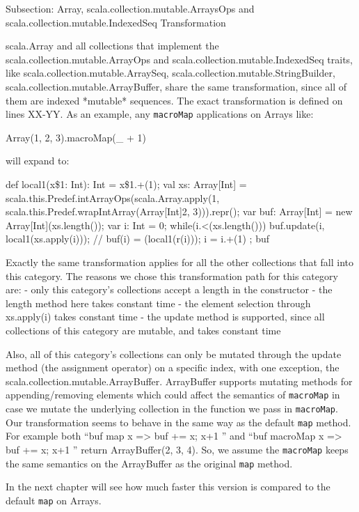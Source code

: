 Subsection: Array, scala.collection.mutable.ArraysOps  and
scala.collection.mutable.IndexedSeq Transformation

scala.Array and all collections that implement the 
scala.collection.mutable.ArrayOps and scala.collection.mutable.IndexedSeq
traits, like scala.collection.mutable.ArraySeq,
scala.collection.mutable.StringBuilder, scala.collection.mutable.ArrayBuffer,
share the same transformation, since all of them are indexed *mutable*
sequences. The exact transformation is defined on lines XX-YY. As an example,
any \texttt{macroMap} applications on Arrays like:

Array(1, 2, 3).macroMap(\_ + 1)

will expand to:

{
  def local1(x\$1: Int): Int = x\$1.+(1);
  val xs: Array[Int] = scala.this.Predef.intArrayOps(scala.Array.apply(1,
scala.this.Predef.wrapIntArray(Array[Int]{2, 3}))).repr();
  var buf: Array[Int] = new Array[Int](xs.length());
  var i: Int = 0;
  while(i.<(xs.length())){
    buf.update(i, local1(xs.apply(i))); // buf(i) = (local1(r(i)));
    i = i.+(1)
  };
  buf
}

Exactly the same transformation applies for all the other collections that fall
into this category. The reasons we chose this transformation path for this
category are:
- only this category's collections accept a length in the constructor
- the length method here takes constant time
- the element selection through xs.apply(i) takes constant time
- the update method is supported, since all collections of this category are
mutable, and takes constant time

Also, all of this category's collections can only be mutated through the
update method (the assignment operator) on a specific index, with one
exception, the scala.collection.mutable.ArrayBuffer. ArrayBuffer supports
mutating methods for appending/removing elements which could affect the
semantics of \texttt{macroMap} in case we mutate the underlying collection in the
function we pass in \texttt{macroMap}. Our transformation seems to behave in the same
way as the default \texttt{map} method. For example both ``buf map {
x => buf += x; x+1 }'' and ``buf macroMap { x => buf += x;
x+1 }'' return ArrayBuffer(2, 3, 4). So, we assume the \texttt{macroMap} keeps the
same semantics on the ArrayBuffer as the original \texttt{map} method.

In the next chapter will see how much faster this version is compared to the
default \texttt{map} on Arrays.

